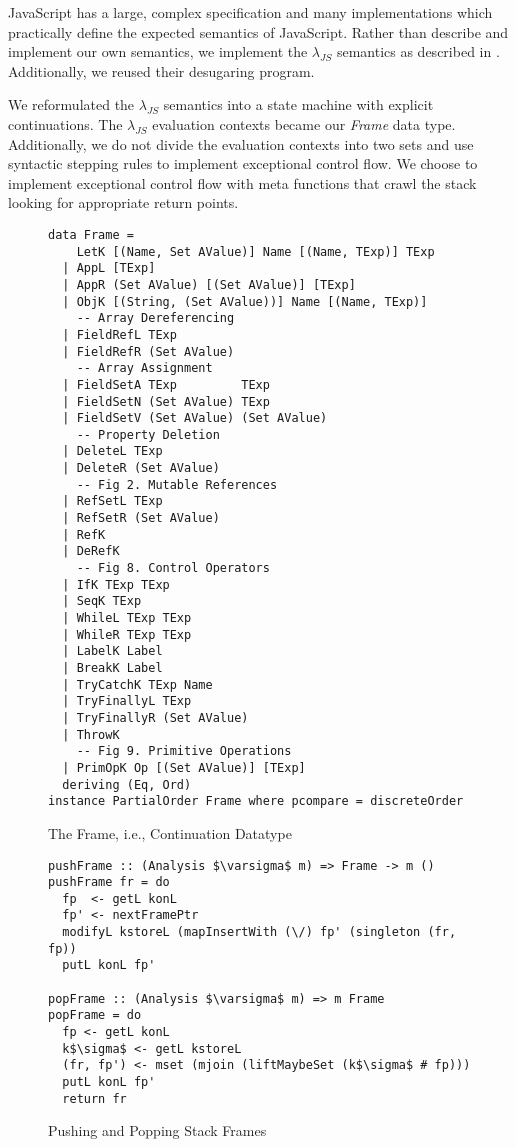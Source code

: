 \documentclass[10pt,letter,english]{article}
\newcommand{\js}[0]{JavaScript}
\newcommand{\lambdajs}[0]{$\lambda_{JS}$}
\begin{document}
\js{} has a large, complex specification and many implementations which
practically define the expected semantics of \js{}. Rather than describe and
implement our own semantics, we implement the \lambdajs{} semantics as described
in \cite{lambdajs}. Additionally, we reused their desugaring program.

We reformulated the \lambdajs{} semantics into a state machine with explicit
continuations. The \lambdajs{} evaluation contexts became our \emph{Frame} data
type. Additionally, we do not divide the evaluation contexts into two sets and
use syntactic stepping rules to implement exceptional control flow. We choose to
implement exceptional control flow with meta functions that crawl the stack
looking for appropriate return points.

\begin{figure}
\centering

\begin{lstlisting}
data Frame =
    LetK [(Name, Set AValue)] Name [(Name, TExp)] TExp
  | AppL [TExp]
  | AppR (Set AValue) [(Set AValue)] [TExp]
  | ObjK [(String, (Set AValue))] Name [(Name, TExp)]
    -- Array Dereferencing
  | FieldRefL TExp
  | FieldRefR (Set AValue)
    -- Array Assignment
  | FieldSetA TExp         TExp
  | FieldSetN (Set AValue) TExp
  | FieldSetV (Set AValue) (Set AValue)
    -- Property Deletion
  | DeleteL TExp
  | DeleteR (Set AValue)
    -- Fig 2. Mutable References
  | RefSetL TExp
  | RefSetR (Set AValue)
  | RefK
  | DeRefK
    -- Fig 8. Control Operators
  | IfK TExp TExp
  | SeqK TExp
  | WhileL TExp TExp
  | WhileR TExp TExp
  | LabelK Label
  | BreakK Label
  | TryCatchK TExp Name
  | TryFinallyL TExp
  | TryFinallyR (Set AValue)
  | ThrowK
    -- Fig 9. Primitive Operations
  | PrimOpK Op [(Set AValue)] [TExp]
  deriving (Eq, Ord)
instance PartialOrder Frame where pcompare = discreteOrder
\end{lstlisting}
\caption{The Frame, i.e., Continuation Datatype}
\end{figure}

\begin{figure}
\centering

\begin{lstlisting}
pushFrame :: (Analysis $\varsigma$ m) => Frame -> m ()
pushFrame fr = do
  fp  <- getL konL
  fp' <- nextFramePtr
  modifyL kstoreL (mapInsertWith (\/) fp' (singleton (fr, fp))
  putL konL fp'

popFrame :: (Analysis $\varsigma$ m) => m Frame
popFrame = do
  fp <- getL konL
  k$\sigma$ <- getL kstoreL
  (fr, fp') <- mset (mjoin (liftMaybeSet (k$\sigma$ # fp)))
  putL konL fp'
  return fr
\end{lstlisting}
\caption{Pushing and Popping Stack Frames}
\end{figure}
\end{document}
